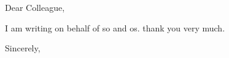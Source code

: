 \documentclass{letter}
\begin{document}
\begin{letter}{}
\opening{Dear Colleague,}

I am writing on behalf of so and os. thank you very much.

\closing{Sincerely,}

\end{letter}
\end{document}
